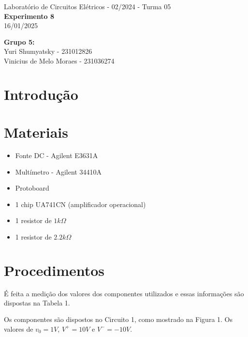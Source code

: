 \documentclass[a4 paper]{article}
\newcommand{\parag}{\hspace{30pt}}
\begin{document}
\justifying
\begin{center}{\large Laboratório de Circuitos Elétricos - 02/2024 - Turma 05}\\
{\large \textbf{Experimento 8}}\\ 
16/01/2025
\end{center}

\vspace{500pt}
 \noindent\textbf{Grupo 5:}\\
 Yuri Shumyatsky - 231012826\\
Vinicius de Melo Moraes - 231036274\\



\vspace{30pt}
\newpage

\section{Introdução}

\section{Materiais}
	\begin{itemize}
	\item Fonte DC - Agilent E3631A
	\item Multímetro - Agilent 34410A
	\item Protoboard
	\item 1 chip UA741CN (amplificador operacional)
	\item 1 resistor de $1k\Omega$
	\item 1 resistor de $2.2k\Omega$
	\end{itemize}

\newpage

\section{Procedimentos}
\parag É feita a medição dos valores dos componentes utilizados e essas informações são dispostas na Tabela 1.



Os componentes são dispostos no Circuito 1, como mostrado na Figura 1. Os valores de $v_0 =1V$, $V^+=10V$ e $V^-=-10V$.
\end{document}
